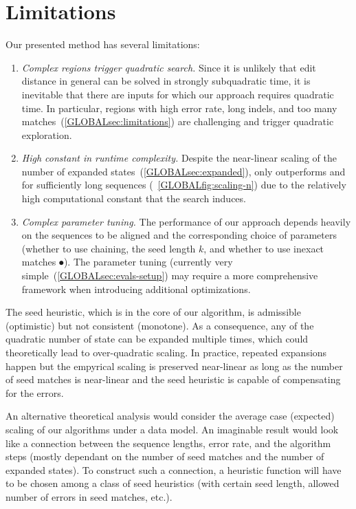 \section*{Limitations}

Our presented method has several limitations:
\begin{enumerate}
  \item \emph{Complex regions trigger quadratic search.} Since it is unlikely
        that edit distance in general can be solved in strongly subquadratic
        time, it is inevitable that there are inputs for which our approach
        requires quadratic time.  In particular, regions with high error rate,
        long indels, and too many matches~(\cref{GLOBALsec:limitations}) are
        challenging and trigger quadratic exploration.
  \item \emph{High constant in runtime complexity.} Despite the near-linear
        scaling of the number of expanded states~(\cref{GLOBALsec:expanded}),
        \astarpa only outperforms \edlib and \wfa for sufficiently long sequences
        (~\cref{GLOBALfig:scaling-n}) due to the relatively high computational constant
        that the \A search induces.
  \item \emph{Complex parameter tuning.} The performance of our approach
        depends heavily on the sequences to be aligned and the corresponding choice of
        parameters (whether to use chaining, the seed length $k$, and whether to use
        inexact matches $\spot$). The parameter tuning (currently
        very simple~(\cref{GLOBALsec:evals-setup}) may require a more comprehensive
        framework when introducing additional optimizations.
\end{enumerate}

The seed heuristic, which is in the core of our \A algorithm, is admissible
(optimistic) but not consistent (monotone). As a consequence, any of the
quadratic number of state can be expanded multiple times, which could
theoretically lead to over-quadratic scaling. In practice, repeated expansions
happen but the empyrical scaling is preserved near-linear as long as the number
of seed matches is near-linear and the seed heuristic is capable of compensating
for the errors.

An alternative theoretical analysis would consider the average case (expected)
scaling of our algorithms under a data model. An imaginable result would look
like a connection between the sequence lengths, error rate, and the algorithm
steps (mostly dependant on the number of seed matches and the number of expanded
states). To construct such a connection, a heuristic function will have to be
chosen among a class of seed heuristics (\AG with certain seed length, allowed
number of errors in seed matches, etc.).
